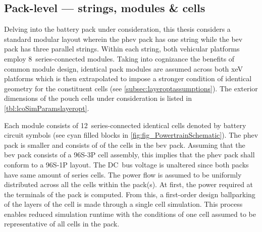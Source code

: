 \subsection{Pack-level --- strings, modules \& cells}\label{sec:packlevelhierarchy}

Delving  into the  battery pack  under  consideration, this  thesis considers  a
standard  modular  layout wherein  the  \gls{phev}  pack  has one  string  while
the  \gls{bev}  pack  has  three  parallel strings.  Within  each  string,  both
vehicular platforms  employ 8~series-connected  modules. Taking  into cognizance
the  benefits  of common  module  design,  identical  pack modules  are  assumed
across  both  \gls{xeV}  platforms  which  is  then  extrapolated  to  impose  a
stronger  condition  of  identical  geometry  for  the  constituent  cells  (see
\cref{subsec:layeroptassumptions}). The  exterior dimensions of the  pouch cells
under consideration is listed in \cref{tbl:lcoSimParamslayeropt}.

Each module consists  of 12~series-connected identical cells  denoted by battery
circuit symbols (see cyan  filled blocks in \cref{fig:fig_PowertrainSchematic}).
The \gls{phev}  pack is smaller and  consists of  of  the cells in
the \gls{bev} pack. Assuming that the \gls{bev} pack consists of a \mbox{96S-3P}
cell  assembly,  this implies  that  the  \gls{phev}  pack  shall conform  to  a
\mbox{96S-1P} layout. The DC~bus voltage is unaltered since both packs have same
amount of  series cells. The power  flow is assumed to  be uniformly distributed
across all  the cells within  the pack(s). At first,  the power required  at the
terminals of the  pack is computed. From this, a  first-order design ballparking
of the layers of the cell is made through a single cell simulation. This process
enables reduced simulation runtime with the conditions of one cell assumed to be
representative of all cells in the pack.




